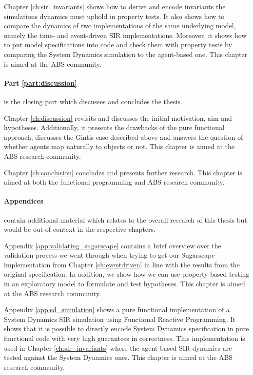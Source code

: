 \medskip

Chapter \ref{ch:sir_invariants} shows how to derive and encode invariants the simulations dynamics must uphold in property tests. It also shows how to compare the dynamics of two implementations of the same underlying model, namely the time- and event-driven SIR implementations. Moreover, it shows how to put model specifications into code and check them with property tests by comparing the System Dynamics simulation to the agent-based one. This chapter is aimed at the ABS community.

\medskip

\paragraph{Part \ref{part:discussion}} is the closing part which discusses and concludes the thesis. 
\medskip

Chapter \ref{ch:discussion} revisits and discusses the initial motivation, aim and hypotheses. Additionally, it presents the drawbacks of the pure functional approach, discusses the Gintis case described above and answers the question of whether agents map naturally to objects or not. This chapter is aimed at the ABS research community.

\medskip

Chapter \ref{ch:conclusion} concludes and presents further research. This chapter is aimed at both the functional programming and ABS research community.

\paragraph{Appendices} contain additional material which relates to the overall research of this thesis but would be out of context in the respective chapters.
\medskip

Appendix \ref{app:validating_sugarscape} contains a brief overview over the validation process we went through when trying to get our Sugarscape implementation from Chapter \ref{ch:eventdriven} in line with the results from the original specification. In addition, we show how we can use property-based testing in an exploratory model to formulate and test hypotheses. This chapter is aimed at the ABS research community.

\medskip

Appendix \ref{app:sd_simulation} shows a pure functional implementation of a System Dynamics SIR simulation using Functional Reactive Programming. It shows that it is possible to directly encode System Dynamics specification in pure functional code with very high guarantees in correctness. This implementation is used in Chapter \ref{ch:sir_invariants} where the agent-based SIR dynamics are tested against the System Dynamics ones. This chapter is aimed at the ABS research community.